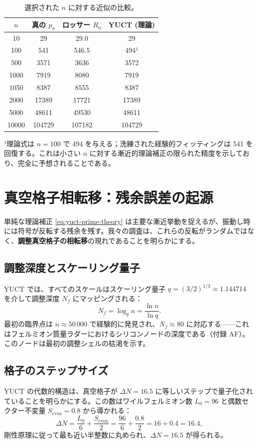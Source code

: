 \documentclass[11pt,a4paper]{article}
\newcommand{\Seven}{S_{\mathrm{even}}}
\begin{document}
	\begin{table}[htbp]
		\centering
		\caption{選択された \(n\) に対する近似の比較。}
		\label{tab:comparison}
		\small
		\begin{tabular}{c c c c}
			\toprule
			$n$ & 真の $p_n$ & ロッサー $R_n$ & YUCT (理論) \\
			\midrule
			10   & 29      & 29.0  & 29  \\
			100  & 541     & 546.5 & 494¹ \\
			500  & 3571    & 3636  & 3572 \\
			1000 & 7919    & 8080  & 7919 \\
			1050 & 8387    & 8555  & 8387 \\
			2000 & 17389   & 17721 & 17389\\
			5000 & 48611   & 49530 & 48611\\
			10000& 104729  & 107182& 104729\\
			\bottomrule
		\end{tabular}
		\par\smallskip
		\footnotesize
		¹理論式は $n=100$ で 494 を与える；洗練された経験的フィッティングは 541 を回復する。これは小さい $n$ に対する漸近的理論補正の限られた精度を示しており、完全に予想されることである。
	\end{table}
	
	\section{真空格子相転移：残余誤差の起源}
	\label{sec:phasetrans}
	単純な理論補正 \eqref{eq:yuct-prime-theory} は主要な漸近挙動を捉えるが、振動し時には符号が反転する残余を残す。我々の調査は、これらの反転がランダムではなく、\textbf{調整真空格子の相転移}の現れであることを明らかにする。
	
	\subsection{調整深度とスケーリング量子}
	YUCT では、すべてのスケールはスケーリング量子 \(q = (3/2)^{1/3} \approx 1.144714\) を介して調整深度 \(N_f\) にマッピングされる：
	\[
	N_f = \log_q n = \frac{\ln n}{\ln q}.
	\]
	最初の臨界点は \(n \approx 50\,000\) で経験的に発見され、\(N_f \approx 80\) に対応する——これはフェルミオン質量ラダーにおけるシリコンノードの深度である（付録 AF）。このノードは最初の調整シェルの枯渇を示す。
	
	\subsection{格子のステップサイズ}
	YUCT の代数的構造は、真空格子が \(\Delta N = 16.5\) に等しいステップで量子化されていることを明らかにする。この数はワイルフェルミオン数 \(L_0 = 96\) と偶数セクター不変量 \(\Seven = 0.8\) から導かれる：
	\[
	\Delta N = \frac{L_0}{6} + \frac{\Seven}{2} = \frac{96}{6} + \frac{0.8}{2} = 16 + 0.4 = 16.4,
	\]
	剛性原理に従って最も近い半整数に丸められ、\(\Delta N = 16.5\) が得られる。
	
\end{document}
